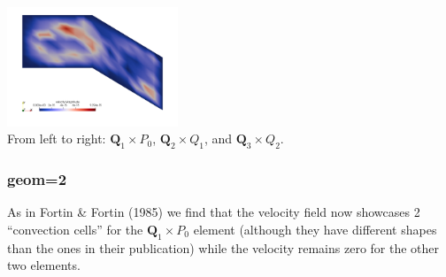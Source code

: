 \begin{center}
\includegraphics[width=5.1cm]{python_codes/fieldstone_42/results/geom1/vel3}\\
{\captionfont From left to right: ${\bm Q}_1\times P_0$, ${\bm Q}_2\times Q_1$, 
and ${\bm Q}_3\times Q_2$.}
\end{center}

\subsubsection{geom=2}

As in Fortin \& Fortin (1985) we find that the velocity field now showcases 2 ``convection
cells'' for the  ${\bm Q}_1\times P_0$ element (although they have different shapes than 
the ones in their publication) while the velocity remains zero for the other two elements. 

